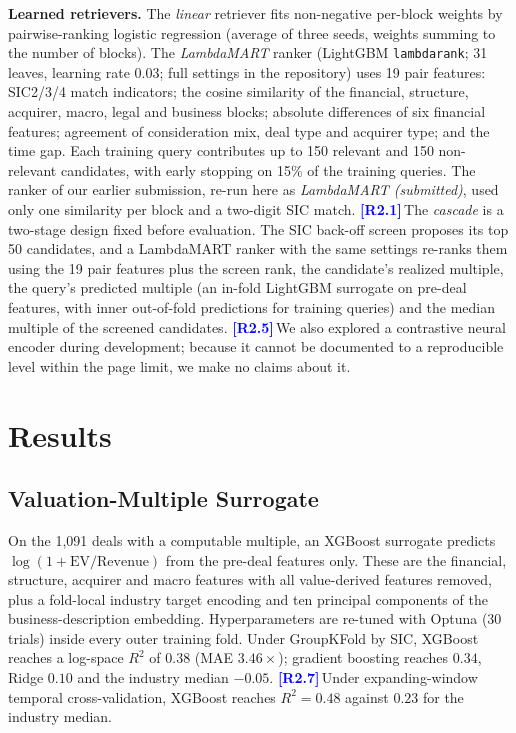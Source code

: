 \documentclass[conference]{IEEEtran}
\newcommand{\rc}[1]{\textcolor{blue}{\textbf{[#1]}}\,}
\newcommand{\rc}[1]{}
\begin{document}
\noindent\textbf{Learned retrievers.}
The \emph{linear} retriever fits non-negative per-block weights by pairwise-ranking logistic regression (average of three seeds, weights summing to the number of blocks). The \emph{LambdaMART} ranker (LightGBM \texttt{lambdarank}; 31 leaves, learning rate 0.03; full settings in the repository) uses 19 pair features: SIC2/3/4 match indicators; the cosine similarity of the financial, structure, acquirer, macro, legal and business blocks; absolute differences of six financial features; agreement of consideration mix, deal type and acquirer type; and the time gap. Each training query contributes up to 150 relevant and 150 non-relevant candidates, with early stopping on 15\% of the training queries. The ranker of our earlier submission, re-run here as \emph{LambdaMART (submitted)}, used only one similarity per block and a two-digit SIC match. \rc{R2.1}The \emph{cascade} is a two-stage design fixed before evaluation. The SIC back-off screen proposes its top 50 candidates, and a LambdaMART ranker with the same settings re-ranks them using the 19 pair features plus the screen rank, the candidate's realized multiple, the query's predicted multiple (an in-fold LightGBM surrogate on pre-deal features, with inner out-of-fold predictions for training queries) and the median multiple of the screened candidates. \rc{R2.5}We also explored a contrastive neural encoder during development; because it cannot be documented to a reproducible level within the page limit, we make no claims about it.

\section{Results}
\label{sec:results}

\subsection{Valuation-Multiple Surrogate}
\label{sec:surrogate}

On the 1{,}091 deals with a computable multiple, an XGBoost surrogate predicts $\log(1+\text{EV/Revenue})$ from the pre-deal features only. These are the financial, structure, acquirer and macro features with all value-derived features removed, plus a fold-local industry target encoding and ten principal components of the business-description embedding. Hyperparameters are re-tuned with Optuna (30 trials) inside every outer training fold. Under GroupKFold by SIC, XGBoost reaches a log-space $R^2$ of $0.38$ (MAE $3.46\times$); gradient boosting reaches $0.34$, Ridge $0.10$ and the industry median $-0.05$. \rc{R2.7}Under expanding-window temporal cross-validation, XGBoost reaches $R^2=0.48$ against $0.23$ for the industry median.
\end{document}
